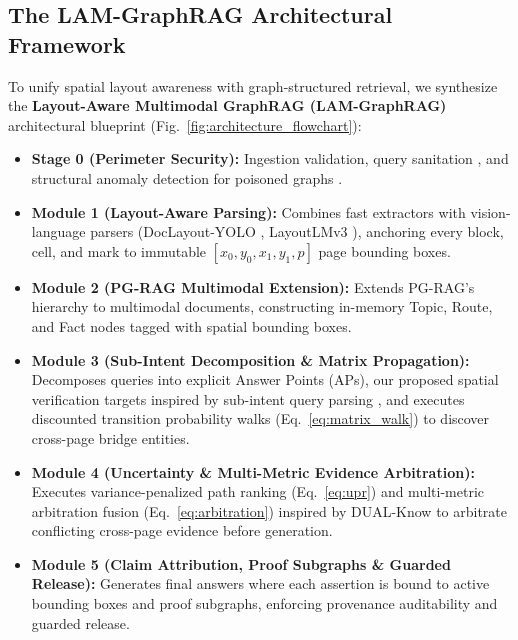 \documentclass[conference,a4paper]{IEEEtran}
\begin{document}
\subsection{The LAM-GraphRAG Architectural Framework}
To unify spatial layout awareness with graph-structured retrieval, we synthesize the \textbf{Layout-Aware Multimodal GraphRAG (LAM-GraphRAG)} architectural blueprint (Fig.~\ref{fig:architecture_flowchart}):
\begin{itemize}
    \item \textbf{Stage 0 (Perimeter Security):} Ingestion validation, query sanitation \cite{hu2025membership}, and structural anomaly detection for poisoned graphs \cite{zheng2026trigger}.
    \item \textbf{Module 1 (Layout-Aware Parsing):} Combines fast extractors with vision-language parsers (DocLayout-YOLO \cite{zhao2024doclayout}, LayoutLMv3 \cite{huang2022}), anchoring every block, cell, and mark to immutable $[x_0, y_0, x_1, y_1, p]$ page bounding boxes.
    \item \textbf{Module 2 (PG-RAG Multimodal Extension):} Extends PG-RAG's hierarchy \cite{niu2026} to multimodal documents, constructing in-memory Topic, Route, and Fact nodes tagged with spatial bounding boxes.
    \item \textbf{Module 3 (Sub-Intent Decomposition \& Matrix Propagation):} Decomposes queries into explicit Answer Points (APs), our proposed spatial verification targets inspired by sub-intent query parsing \cite{wang2025, zhang2026m2ag}, and executes discounted transition probability walks (Eq.~\ref{eq:matrix_walk}) to discover cross-page bridge entities.
    \item \textbf{Module 4 (Uncertainty \& Multi-Metric Evidence Arbitration):} Executes variance-penalized path ranking (Eq.~\ref{eq:upr}) and multi-metric arbitration fusion (Eq.~\ref{eq:arbitration}) inspired by DUAL-Know \cite{qi2026} to arbitrate conflicting cross-page evidence before generation.
    \item \textbf{Module 5 (Claim Attribution, Proof Subgraphs \& Guarded Release):} Generates final answers where each assertion is bound to active bounding boxes and proof subgraphs, enforcing provenance auditability and guarded release.
\end{itemize}
\end{document}
